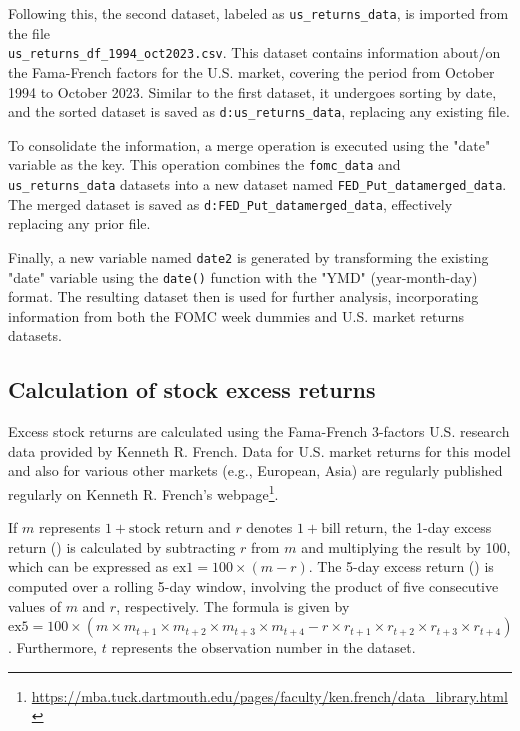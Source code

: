 Following this, the second dataset, labeled as \texttt{us\_returns\_data}, is imported from the file \\ \texttt{us\_returns\_df\_1994\_oct2023.csv}. This dataset contains information about/on the Fama-French factors for the U.S. market, covering the period from October 1994 to October 2023. Similar to the first dataset, it undergoes sorting by date, and the sorted dataset is saved as \texttt{d:us\_returns\_data}, replacing any existing file.

To consolidate the information, a merge operation is executed using the "date" variable as the key. This operation combines the \texttt{fomc\_data} and \texttt{us\_returns\_data} datasets into a new dataset named \texttt{FED\_Put\_datamerged\_data}. The merged dataset is saved as \texttt{d:FED\_Put\_datamerged\_data}, effectively replacing any prior file.

Finally, a new variable named \texttt{date2} is generated by transforming the existing "date" variable using the \texttt{date()} function with the "YMD" (year-month-day) format. The resulting dataset then is used for further analysis, incorporating information from both the FOMC week dummies and U.S. market returns datasets.

\subsection{Calculation of stock excess returns}

Excess stock returns are calculated using the Fama-French 3-factors U.S.  research data provided by Kenneth R. French.
Data for U.S. market returns for this model and also for various other markets (e.g., European, Asia) are regularly published regularly on Kenneth R. French's webpage\footnote{\url{https://mba.tuck.dartmouth.edu/pages/faculty/ken.french/data_library.html}}.

If \(m\) represents \(1 + \text{{stock return}}\) and \(r\) denotes \(1 + \text{{bill return}}\), the 1-day excess return () is calculated by subtracting \(r\) from \(m\) and multiplying the result by 100, which can be expressed as \(\text{{ex1}} = 100 \times (m - r)\). 
The 5-day excess return () is computed over a rolling 5-day window, involving the product of five consecutive values of \(m\) and \(r\), respectively. The formula is given by \(\text{{ex5}} = 100 \times (m \times m_{t+1} \times m_{t+2} \times m_{t+3} \times m_{t+4} - r \times r_{t+1} \times r_{t+2} \times r_{t+3} \times r_{t+4})\).
Furthermore, \(t\) represents the observation number in the dataset. 

